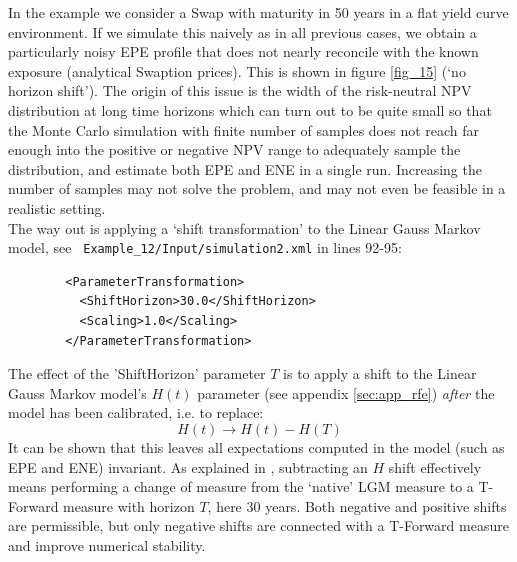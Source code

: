 \documentclass[12pt, a4paper]{article}
\begin{document}
{In the example we consider a Swap with maturity in 50 years in a flat yield curve environment. If we simulate this
naively as in all previous cases, we obtain a particularly noisy EPE profile that does not nearly reconcile with the
known exposure (analytical Swaption prices). This is shown in figure \ref{fig_15} (`no horizon shift'). The origin of
this issue is the width of the risk-neutral NPV distribution at long time horizons which can turn out to be quite small
so that the Monte Carlo simulation with finite number of samples does not reach far enough into the positive or negative
NPV range to adequately sample the distribution, and estimate both EPE and ENE in a single run.  Increasing the number
of samples may not solve the problem, and may not even be feasible in a realistic setting. \\

The way out is applying a `shift transformation' to the Linear Gauss Markov model, see {\tt
  Example\_12/Input/simulation2.xml} in lines 92-95:
\begin{listing}[H]
\begin{verbatim}
        <ParameterTransformation>
          <ShiftHorizon>30.0</ShiftHorizon>
          <Scaling>1.0</Scaling>
        </ParameterTransformation>
\end{verbatim}
\end{listing}

The effect of the 'ShiftHorizon' parameter $T$ is to apply a shift to the Linear Gauss Markov model's $H(t)$ parameter
(see appendix \ref{sec:app_rfe}) {\em after} the model has been calibrated, i.e. to replace:
$$ 
H(t) \rightarrow H(t) - H(T) 
$$ 
It can be shown that this leaves all expectations computed in the model (such as EPE and ENE) invariant. As explained in
\cite{Lichters}, subtracting an $H$ shift effectively means performing a change of measure from the `native' LGM measure
to a T-Forward measure with horizon $T$, here 30 years. Both negative and positive shifts are permissible, but only
negative shifts are connected with a T-Forward measure and improve numerical stability. \\

}
\end{document}
